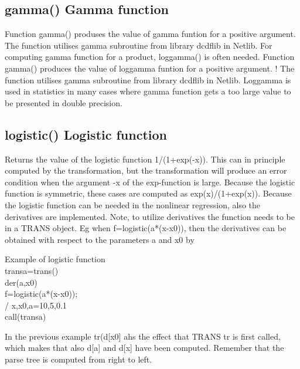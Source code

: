 \subsection{\textcolor{VioletRed}{gamma}() Gamma function}
\label{gamma}
Function \textcolor{VioletRed}{gamma}() produses the value of gamma funtion for a positive argument.
The function utilises gamma subroutine from
library dcdflib in Netlib. For computing gamma function for a product, \textcolor{VioletRed}{loggamma}() is often needed.
\label{loggamma}
Function \textcolor{VioletRed}{gamma}() produces the value of loggamma funtion for a positive argument.
	!
The function utilises gamma subroutine from
library dcdflib in Netlib. Loggamma is used in statistics in many cases where
gamma function gets a too large value to be presented in double precision.
\subsection{\textcolor{VioletRed}{logistic}() Logistic function}
\label{logistic}
Returns the value of the logistic function 1/(1+\textcolor{VioletRed}{exp}(-x)). This can in principle computed by the
transformation, but the transformation will produce an error condition when the argument -x
of the exp-function is large. Because the logistic function is symmetric, these cases are
computed as \textcolor{VioletRed}{exp}(x)/(1+\textcolor{VioletRed}{exp}(x)). Because the logistic function can be needed in the nonlinear
regression, also the derivatives are implemented.  Note, to utilize derivatives
the function needs to be in a TRANS object.
Eg when f=\textcolor{VioletRed}{logistic}(a*(x-x0)), then
the derivatives can be obtained with respect to the parameters a and x0 by
\begin{example}[logisticex]Example of logistic function\\
\label{logisticex}
transa=\textcolor{VioletRed}{trans}()\\
\textcolor{VioletRed}{der}(a,x0)\\
f=\textcolor{VioletRed}{logistic}(a*(x-x0));\\
/
x,x0,a=10,5,0.1\\
\textcolor{VioletRed}{call}(transa)
\end{example}
\begin{note}
In the previous example tr(d[x0] ahs the effect that TRANS tr is first
called, which makes that also d[a] and d[x] have been computed. Remember that
the parse tree is computed from right to left.
\end{note}
